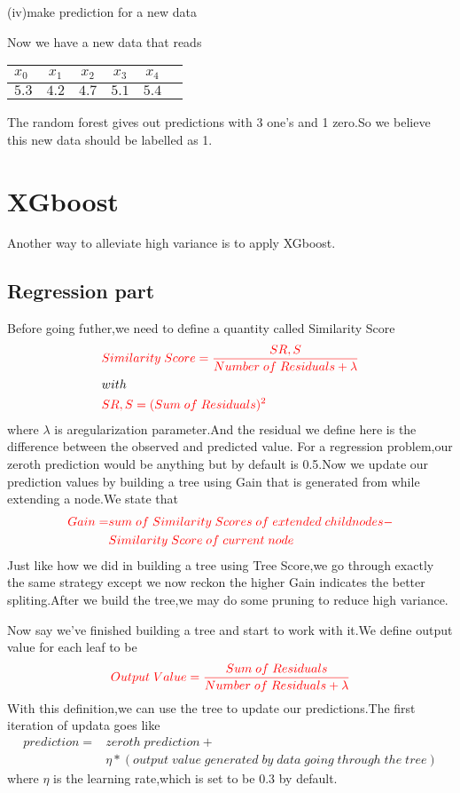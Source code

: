 \documentclass{article}
\begin{document}
(iv)make prediction for a new data

Now we have a new data that reads
\begin{center}
\begin{tabular}{|l|c|c|c|c|r|}
	\hline
	$x_0$&$x_1$&$x_2$&$x_3$&$x_4$\\ \hline
	$5.3$&$4.2$&$4.7$&$5.1$&$5.4$\\ \hline
\end{tabular}
\end{center}
The random forest gives out predictions with 3 one's and 1 zero.So we believe this new data should be labelled as 1.
\section{XGboost}
Another way to alleviate high variance is to apply XGboost.
\subsection{Regression part}
Before going futher,we need to define a quantity called Similarity Score
\begin{align*}
	&\textcolor{red}{Similarity\;Score=\frac{SR,S}{Number\;of\;Residuals+\lambda}}\\
	&with\\
	&\textcolor{red}{SR,S=(Sum\;of\;Residuals)^2}
\end{align*}
where $\lambda$ is aregularization parameter.And the residual we define here is the difference between the observed and predicted value.
For a regression problem,our zeroth prediction would be anything but by default is 0.5.Now we update our prediction values by building a tree using Gain that is generated from while extending a node.We state that
\begin{align*}
\textcolor{red}{Gain=}&\textcolor{red}{sum\;of\;Similarity\;Scores\;of\;extended\;childnodes-}\\&\textcolor{red}{Similarity\;Score\;of\;current\;node}
\end{align*}
Just like how we did in building a tree using Tree Score,we go through exactly the same strategy except we now reckon the higher Gain indicates the better spliting.After we build the tree,we may do some pruning to reduce high variance.

Now say we've finished building a tree and start to work with it.We define output value for each leaf to be
\begin{align*}
	\textcolor{red}{Output\;Value=\frac{Sum\;of\;Residuals}{Number\;of\;Residuals+\lambda}}
\end{align*}
With this definition,we can use the tree to update our predictions.The first iteration of updata goes like
\begin{align*}
	prediction=&zeroth\;prediction+\\&\eta*(output\;value\;generated\;by\;data\;going\;through\;the\;tree)
\end{align*}
where $\eta$ is the learning rate,which is set to be 0.3 by default.
\end{document}
